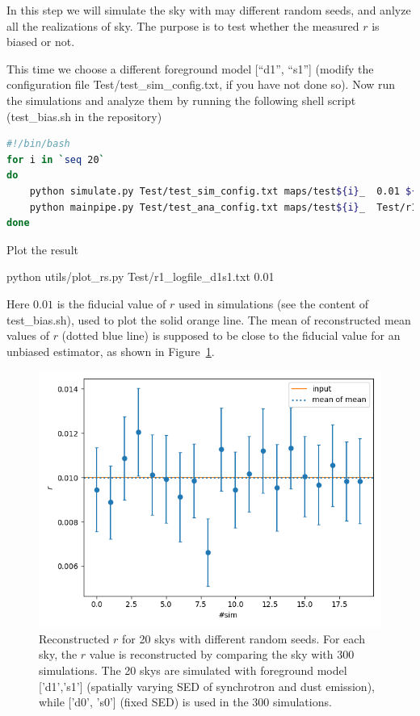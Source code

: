 \documentclass[12pt, a4paper]{ctexart} %
\def\tbox#1{\begin{tcolorbox}#1\end{tcolorbox}}
\begin{document}
In this step we will simulate the sky with may different random seeds, and anlyze all the realizations of sky. The purpose is to test whether the measured $r$ is biased or not.

This time we choose a different foreground model [``d1'', ``s1''] (modify the configuration file Test/test\_sim\_config.txt, if you have not done so). Now run the simulations and analyze them by running the following shell script (test\_bias.sh in the repository)


\begin{lstlisting}[language=bash, caption={Testing $r$ bias}]
#!/bin/bash
for i in `seq 20` 
do 
    python simulate.py Test/test_sim_config.txt maps/test${i}_  0.01 ${i}  d1s1  
    python mainpipe.py Test/test_ana_config.txt maps/test${i}_  Test/r1_logfile_d1s1.txt
done
\end{lstlisting}



Plot the result
\tbox{python utils/plot\_rs.py Test/r1\_logfile\_d1s1.txt 0.01}

Here $0.01$ is the fiducial value of $r$ used in simulations (see the content of test\_bias.sh), used to plot the solid orange line. The mean of reconstructed mean values of $r$ (dotted blue line) is supposed to be close to the fiducial value for an unbiased estimator, as shown in Figure~\ref{fig:r_logs}.
\begin{figure}
  \includegraphics[width=\textwidth]{r_logs.png}
  \caption{Reconstructed $r$ for 20 skys with different random seeds. For each sky, the $r$ value is reconstructed by comparing the sky with 300 simulations. The 20 skys are simulated with foreground model ['d1','s1'] (spatially varying SED of synchrotron and dust emission), while  ['d0', 's0'] (fixed SED) is used in the 300 simulations. \label{fig:r_logs}}
\end{figure}
\end{document}
